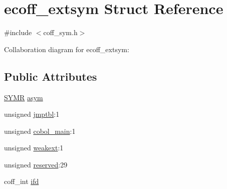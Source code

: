 \hypertarget{structecoff__extsym}{
\section{ecoff\_\-extsym Struct Reference}
\label{structecoff__extsym}
}


{\ttfamily \#include $<$coff\_\-sym.h$>$}



Collaboration diagram for ecoff\_\-extsym:
\subsection*{Public Attributes}
\begin{DoxyCompactItemize}
\item 
\hyperlink{structecoff__sym}{SYMR} \hyperlink{structecoff__extsym_a87f587c09c222ba0922c7ee88c1a6b8b}{asym}
\item 
unsigned \hyperlink{structecoff__extsym_a803653253624913be2a4593db1429fb1}{jmptbl}:1
\item 
unsigned \hyperlink{structecoff__extsym_acbb40b2a7a64c4d3b141277f8cd7f735}{cobol\_\-main}:1
\item 
unsigned \hyperlink{structecoff__extsym_afc5d5b07df88423a1f2c1d11ad5b4caa}{weakext}:1
\item 
unsigned \hyperlink{structecoff__extsym_a190ce15962a8ce49490bbddc1574d11e}{reserved}:29
\item 
coff\_\-int \hyperlink{structecoff__extsym_add003edd8dbbaa77df9d6632e7cbefab}{ifd}
\end{DoxyCompactItemize}


